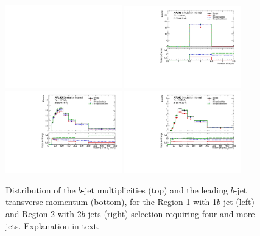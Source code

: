 \begin{figure}[!htb]
\centering
\includegraphics[width=0.45\textwidth]{Plots/ttV/dummy}
\includegraphics[width=0.45\textwidth]{Plots/ttV/generator/c_Region_1_nBtagJets}\\
\includegraphics[width=0.45\textwidth]{Plots/ttV/generator/c_Region_0_Bjet_Pt_0}
\includegraphics[width=0.45\textwidth]{Plots/ttV/generator/c_Region_1_Bjet_Pt_0}\\
  \caption{Distribution of the $b$-jet multiplicities (top) and the leading $b$-jet transverse momentum (bottom), for the Region 1 with 1$b$-jet (left) and Region 2 with 2$b$-jets (right) selection requiring four and more jets. Explanation in text. \label{ttV:4jbinfo}}
\end{figure}



